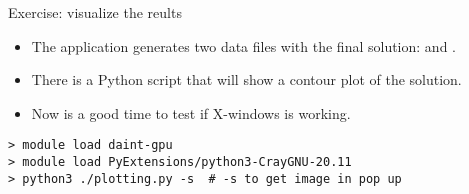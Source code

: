 \documentclass[aspectratio=43]{beamer}
\begin{document}
\begin{frame}[fragile]{Exercise: visualize the reults}
    \begin{itemize}
        \item The application generates two data files with the final solution:  and .
        \item There is a Python script that will show a contour plot  of the solution.
        \item Now is a good time to test if X-windows is working.
    \end{itemize}
\begin{lstlisting}[style=terminal]
> module load daint-gpu
> module load PyExtensions/python3-CrayGNU-20.11
> python3 ./plotting.py -s  # -s to get image in pop up
\end{lstlisting}
\end{frame}

\end{document}
